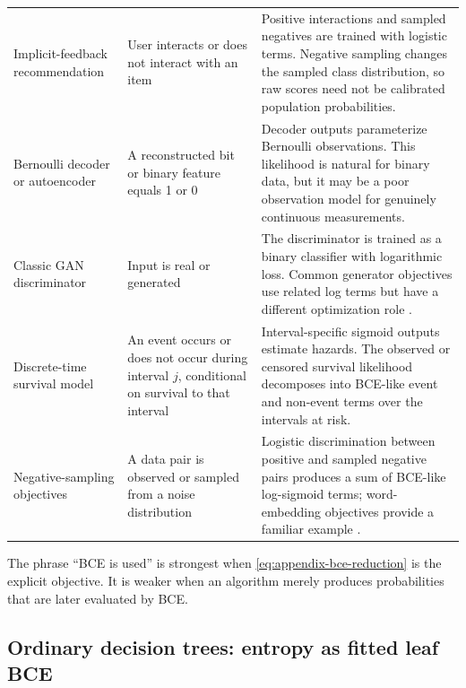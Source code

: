 \documentclass[11pt]{article}
\newcommand{\rowrule}{\specialrule{0.20pt}{1.25pt}{1.25pt}}
\theoremstyle{definition}
\begin{document}
\begin{longtable}{>{\raggedright\arraybackslash}p{}>{\raggedright\arraybackslash}p{}>{\raggedright\arraybackslash}p{}}
Implicit-feedback recommendation
& User interacts or does not interact with an item
& Positive interactions and sampled negatives are trained with logistic terms. Negative sampling changes the sampled class distribution, so raw scores need not be calibrated population probabilities. \\
\rowrule

Bernoulli decoder or autoencoder
& A reconstructed bit or binary feature equals 1 or 0
& Decoder outputs parameterize Bernoulli observations. This likelihood is natural for binary data, but it may be a poor observation model for genuinely continuous measurements. \\
\rowrule

Classic GAN discriminator
& Input is real or generated
& The discriminator is trained as a binary classifier with logarithmic loss. Common generator objectives use related log terms but have a different optimization role \cite{goodfellow2014}. \\
\rowrule

Discrete-time survival model
& An event occurs or does not occur during interval $j$, conditional on survival to that interval
& Interval-specific sigmoid outputs estimate hazards. The observed or censored survival likelihood decomposes into BCE-like event and non-event terms over the intervals at risk. \\
\rowrule

Negative-sampling objectives
& A data pair is observed or sampled from a noise distribution
& Logistic discrimination between positive and sampled negative pairs produces a sum of BCE-like log-sigmoid terms; word-embedding objectives provide a familiar example \cite{mikolov2013}. \\
\end{longtable}
\normalsize

The phrase ``BCE is used'' is strongest when \cref{eq:appendix-bce-reduction} is the explicit objective. It is weaker when an algorithm merely produces probabilities that are later evaluated by BCE.

\subsection{Ordinary decision trees: entropy as fitted leaf BCE}
\label{app:ordinary-trees}
\thispagestyle{fancy}
\end{document}
